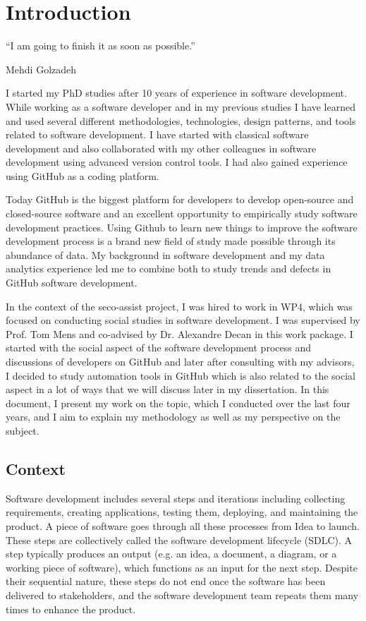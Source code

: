 \chapter{Introduction}
\epigraph{
``I am going to finish it as soon as possible.'' }{Mehdi Golzadeh}

I started my PhD studies after 10 years of experience in software development. While working as a software developer and in my previous studies I have learned and used several different methodologies, technologies, design patterns, and tools related to software development. I have started with classical software development and also collaborated with my other colleagues in software development using advanced version control tools. I had also gained experience using GitHub as a coding platform.

Today GitHub is the biggest platform for developers to develop open-source and closed-source software and an excellent opportunity to empirically study software development practices. Using Github to learn new things to improve the software development process is a brand new field of study made possible through its abundance of data. My background in software development and my data analytics experience led me to combine both to study trends and defects in GitHub software development. 

In the context of the seco-assist project, I was hired to work in WP4, which was focused on conducting social studies in software development.
I was supervised by Prof. Tom Mens and co-advised by Dr. Alexandre Decan in this work package.
I started with the social aspect of the software development process and discussions of developers on GitHub and later after consulting with my advisors, I decided to study automation tools in GitHub which is also related to the social aspect in a lot of ways that we will discuss later in my dissertation. 
In this document, I present my work on the topic, which I conducted over the last four years, and I aim to explain my methodology as well as my perspective on the subject.

\section{Context}

Software development includes several steps and iterations including collecting requirements, creating applications, testing them, deploying, and maintaining the product. A piece of software goes through all these processes from Idea to launch. These steps are collectively called the software development lifecycle (SDLC).
A step typically produces an output (e.g. an idea, a document, a diagram, or a working piece of software), which functions as an input for the next step. 
Despite their sequential nature, these steps do not end once the software has been delivered to stakeholders, and the software development team repeats them many times to enhance the product.


